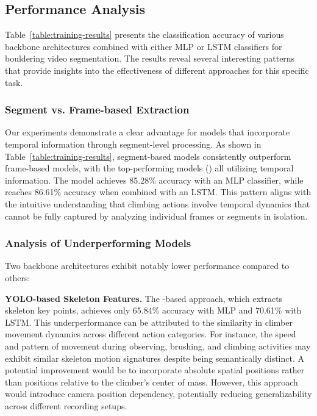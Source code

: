 \subsection{Performance Analysis}
Table~\ref{table:training-results} presents the classification accuracy of various backbone architectures combined with either MLP or LSTM classifiers for bouldering video segmentation. The results reveal several interesting patterns that provide insights into the effectiveness of different approaches for this specific task.

\subsubsection{Segment vs. Frame-based Extraction}
Our experiments demonstrate a clear advantage for models that incorporate temporal information through segment-level processing. As shown in Table~\ref{table:training-results}, segment-based models consistently outperform frame-based models, with the top-performing models () all utilizing temporal information. The  model achieves 85.28\% accuracy with an MLP classifier, while  reaches 86.61\% accuracy when combined with an LSTM. This pattern aligns with the intuitive understanding that climbing actions involve temporal dynamics that cannot be fully captured by analyzing individual frames or segments in isolation.

\subsubsection{Analysis of Underperforming Models}
Two backbone architectures exhibit notably lower performance compared to others:

\noindent\textbf{YOLO-based Skeleton Features.}
The -based approach, which extracts skeleton key points, achieves only 65.84\% accuracy with MLP and 70.61\% with LSTM. This underperformance can be attributed to the similarity in climber movement dynamics across different action categories. For instance, the speed and pattern of movement during observing, brushing, and climbing activities may exhibit similar skeleton motion signatures despite being semantically distinct. A potential improvement would be to incorporate absolute spatial positions rather than positions relative to the climber's center of mass. However, this approach would introduce camera position dependency, potentially reducing generalizability across different recording setups.

